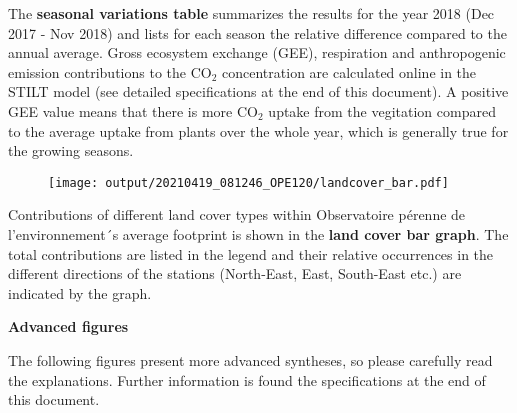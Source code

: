 \documentclass[a4paper,11pt]{article}
\begin{document}
        \begin{flushleft}
        \begin{small}The \textbf{seasonal variations table} summarizes the results for the year 2018 (Dec 2017 - Nov 2018) and lists for each season the relative difference compared to the annual average. Gross ecosystem exchange (GEE), respiration and anthropogenic emission contributions to the {\ensuremath{\mathrm{CO_2}}} concentration are calculated online in the STILT model (see detailed specifications at the end of this document). A positive GEE value means that there is more {\ensuremath{\mathrm{CO_2}}} uptake from the vegitation compared to the average uptake from plants over the whole year, which is generally true for the growing seasons.
        \end{small}
        \end{flushleft}
        
        \begin{figure}[!h]
        \texttt{[image: output/20210419\_081246\_OPE120/landcover\_bar.pdf]}
        \end{figure}
    
        \begin{flushleft}
        \begin{small}Contributions of different land cover types within Observatoire pérenne de l'environnement´s average footprint is shown in the  \textbf{land cover bar graph}. The total contributions are listed in the legend and their relative occurrences in the different directions of the stations (North-East, East, South-East etc.) are indicated by the graph. \end{small}
        \end{flushleft}
        
        \pagebreak

        \begin{flushleft}
        \begin{large}
        \textbf{Advanced figures}\\
        
        \bigskip
        
The following figures present more advanced syntheses, so please carefully read the explanations. Further information is found the specifications at the end of this document.

        \end{large}
        \end{flushleft}
        
\end{document}
